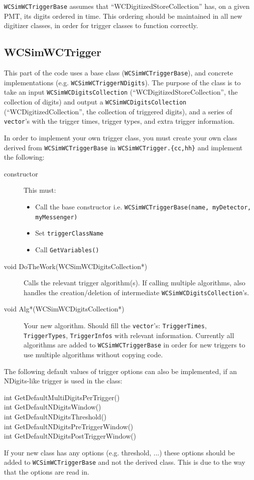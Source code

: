 \texttt{WCSimWCTriggerBase} assumes that ``WCDigitizedStoreCollection'' has, on a given PMT, its digits ordered in time. This ordering should be maintained in all new digitizer classes, in order for trigger classes to function correctly.

\subsection{WCSimWCTrigger}
\label{sec:daq:trigger}

This part of the code uses a base class (\texttt{WCSimWCTriggerBase}), and concrete implementations (e.g. \texttt{WCSimWCTriggerNDigits}). The purpose of the class is to take an input \texttt{WCSimWCDigitsCollection} (``WCDigitizedStoreCollection'', the collection of digits) and output a \texttt{WCSimWCDigitsCollection} (``WCDigitizedCollection'', the collection of triggered digits), and a series of \texttt{vector}'s with the trigger times, trigger types, and extra trigger information.

In order to implement your own trigger class, you must create your own class derived from \texttt{WCSimWCTriggerBase} in \texttt{WCSimWCTrigger.\{cc,hh\}} and implement the following:
\begin{description}
\item[constructor] This must:
  \begin{itemize}
  \item Call the base constructor i.e. \texttt{WCSimWCTriggerBase(name, myDetector, myMessenger)}
  \item Set \texttt{triggerClassName}
  \item Call \texttt{GetVariables()}
  \end{itemize}
\item[void DoTheWork(WCSimWCDigitsCollection*)] Calls the relevant trigger algorithm(s). If calling multiple algorithms, also handles the creation/deletion of intermediate \texttt{WCSimWCDigitsCollection}'s.
\item[void Alg*(WCSimWCDigitsCollection*)] Your new algorithm. Should fill the \texttt{vector}'s: \texttt{TriggerTimes}, \texttt{TriggerTypes}, \texttt{TriggerInfos} with relevant information. Currently all algorithms are added to \texttt{WCSimWCTriggerBase} in order for new triggers to use multiple algorithms without copying code.
\end{description}
The following default values of trigger options can also be implemented, if an NDigits-like trigger is used in the class:
\begin{description}
\item[int GetDefaultMultiDigitsPerTrigger()]
\item[int GetDefaultNDigitsWindow()]
\item[int GetDefaultNDigitsThreshold()]
\item[int GetDefaultNDigitsPreTriggerWindow()]
\item[int GetDefaultNDigitsPostTriggerWindow()]
\end{description}
If your new class has any options (e.g. threshold, ...) these options should be added to \texttt{WCSimWCTriggerBase} and not the derived class. This is due to the way that the options are read in.

